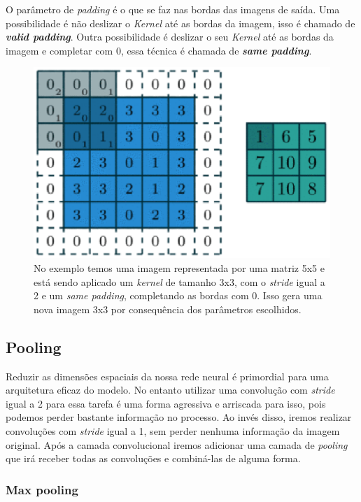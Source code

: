 O parâmetro de \textit{padding} é o que se faz nas bordas das imagens
de saída. Uma possibilidade é não deslizar o \textit{Kernel} até as
bordas da imagem, isso é chamado de {\bf \emph{valid padding}}. Outra
possibilidade é deslizar o seu \textit{Kernel} até as bordas da imagem
e completar com 0, essa técnica é chamada de {\bf \emph{same
    padding}}.

\begin{figure}[H]
\centering
\includegraphics[scale=0.6]{imagens/conv_kernel_pad_stride.eps}
\caption{No exemplo temos uma imagem representada por uma matriz 5x5 e
  está sendo aplicado um \textit{kernel} de tamanho 3x3, com o
  \textit{stride} igual a 2 e um \textit{same padding}, completando as
  bordas com 0. Isso gera uma nova imagem 3x3 por consequência dos
  parâmetros escolhidos.}
\label{fig:convolution_kernel}
\end{figure}

\subsection{Pooling}

Reduzir as dimensões espaciais da nossa rede neural é primordial para
uma arquitetura eficaz do modelo. No entanto utilizar uma convolução
com \textit{stride} igual a 2 para essa tarefa é uma forma agressiva e
arriscada para isso, pois podemos perder bastante informação no
processo. Ao invés disso, iremos realizar convoluções com \textit{stride} igual
a 1, sem perder nenhuma informação da imagem original. Após a camada
convolucional iremos adicionar uma camada de \textit{pooling} que irá
receber todas as convoluções e combiná-las de alguma
forma\cite{Dumoulin2016}.

\subsubsection{Max pooling}

